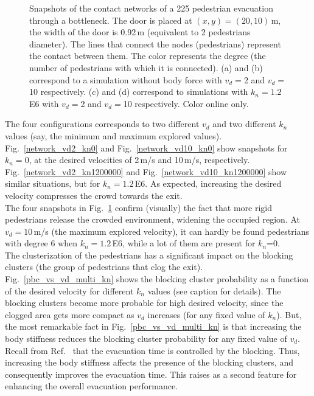 \documentclass[preprint,12pt]{elsarticle}
\begin{document}
\begin{figure}[!htbp]
\caption[width=0.47\columnwidth]{Snapshots of the contact networks of a 225 pedestrian evacuation through a bottleneck. The door is placed at $(x,y)=(20,10)\,$m, the width of the door is 0.92$\,$m (equivalent to 2 pedestrian\textsc{}s diameter). The lines that connect the nodes (pedestrians) represent the contact between them. The color represents the degree (the number of pedestrians with which it is connected). (a) and (b) correspond to a simulation without body force with $v_d=$2 and $v_d=$10 respectively. (c) and (d) correspond to simulations with $k_n=1.2\,$E6 with $v_d=$2 and $v_d=$10 respectively. Color online only.}
\label{network_bottleneck}
\end{figure}



The four configurations corresponds to two different $v_d$ and two different $k_n$ values (say, the  minimum and maximum explored values). Fig.~\ref{network_vd2_kn0} and Fig.~\ref{network_vd10_kn0} show snapshots for $k_n=0$, at the desired velocities of 2$\,$m/s and 10$\,$m/s, respectively.    Fig.~\ref{network_vd2_kn1200000} and Fig.~\ref{network_vd10_kn1200000} show similar situations, but for  $k_n=1.2\,$E6. As expected, increasing the desired velocity compresses the crowd towards the exit. \\

The four snapshots in Fig.~\ref{network_bottleneck} confirm (visually) the fact that more rigid pedestrians release the crowded environment, widening the occupied region. At $v_d=10\,$m/s (the maximum explored velocity), it can hardly be found pedestrians with degree 6 when $k_n=1.2\,$E6, while a lot of them are present for $k_n$=0.\\

The clusterization of the pedestrians has a significant impact on the blocking clusters (the group of pedestrians that clog the exit).  Fig.~\ref{pbc_vs_vd_multi_kn} shows the blocking cluster probability as a function of the desired velocity for different $k_n$ values (see caption for details). The blocking clusters become more probable for high desired velocity, since the clogged area gets more compact as $v_d$ increases (for any fixed value of $k_n$). But, the most remarkable fact in Fig.~\ref{pbc_vs_vd_multi_kn} is that increasing the body stiffness reduces the blocking cluster probability for any fixed value of $v_d$. Recall from Ref.~\cite{dorso_2005} that the evacuation time is controlled by the blocking. Thus, increasing the body stiffness affects the presence of the blocking clusters, and consequently improves the evacuation time. This raises as a second feature for enhancing the overall evacuation performance. \\
\end{document}
